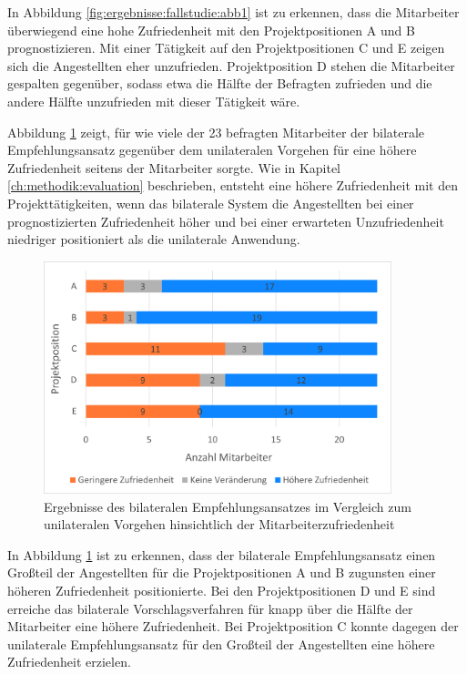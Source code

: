 In Abbildung \ref{fig:ergebnisse:fallstudie:abb1} ist zu erkennen, dass die Mitarbeiter überwiegend eine hohe Zufriedenheit mit den Projektpositionen A und B prognostizieren. Mit einer Tätigkeit auf den Projektpositionen C und E zeigen sich die Angestellten eher unzufrieden. Projektposition D stehen die Mitarbeiter gespalten gegenüber, sodass etwa die Hälfte der Befragten zufrieden und die andere Hälfte unzufrieden mit dieser Tätigkeit wäre.

Abbildung \ref{fig:ergebnisse:analyse:abb7} zeigt, für wie viele der 23 befragten Mitarbeiter der bilaterale Empfehlungsansatz gegenüber dem unilateralen Vorgehen für eine höhere Zufriedenheit seitens der Mitarbeiter sorgte. Wie in Kapitel \ref{ch:methodik:evaluation} beschrieben, entsteht eine höhere Zufriedenheit mit den Projekttätigkeiten, wenn das bilaterale System die Angestellten bei einer prognostizierten Zufriedenheit höher und bei einer erwarteten Unzufriedenheit niedriger positioniert als die unilaterale Anwendung.

\begin{figure}[h]
	\centering
	\includegraphics[width=0.9\textwidth]{gfx/zufriedenheit-projekte.png}	
	\caption{Ergebnisse des bilateralen Empfehlungsansatzes im Vergleich zum unilateralen Vorgehen hinsichtlich der Mitarbeiterzufriedenheit}
	\label{fig:ergebnisse:analyse:abb7}
\end{figure}

In Abbildung \ref{fig:ergebnisse:analyse:abb7} ist zu erkennen, dass der bilaterale Empfehlungsansatz einen Großteil der Angestellten für die Projektpositionen A und B zugunsten einer höheren Zufriedenheit positionierte. Bei den Projektpositionen D und E sind erreiche das bilaterale Vorschlagsverfahren für knapp über die Hälfte der Mitarbeiter eine höhere Zufriedenheit. Bei Projektposition C konnte dagegen der unilaterale Empfehlungsansatz für den Großteil der Angestellten eine höhere Zufriedenheit erzielen.

